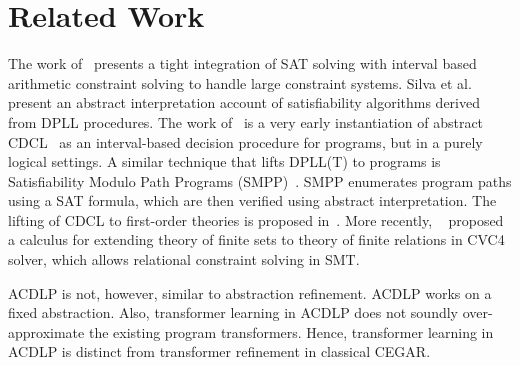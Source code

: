 \section{Related Work}
%
The work of~\cite{franzle} presents a tight integration of SAT solving
with interval based arithmetic constraint solving to handle large constraint
systems. 
%
Silva et al.~\cite{sas12} present an abstract interpretation account of 
satisfiability algorithms derived from DPLL procedures.  
%
The work of~\cite{tacas12} is a very early instantiation of abstract 
CDCL~\cite{sas12} as an interval-based decision procedure for programs, 
but in a purely logical settings.  
%
A similar technique that lifts DPLL(T) to programs is Satisfiability Modulo 
Path Programs (SMPP)~\cite{SMPP}. SMPP enumerates program paths using a SAT 
formula, which are then verified using abstract interpretation.  
%
%
The lifting of CDCL to first-order theories is proposed
in~\cite{dpll,ndsmt,vmcai13}.
%
  More recently, ~\cite{cade17} proposed a calculus for extending theory of
  finite sets to theory of finite relations in CVC4 solver, which allows
  relational constraint solving in SMT.  
  
  ACDLP is not, however, similar to abstraction refinement. ACDLP works on a fixed
  abstraction. Also, transformer learning in ACDLP does not soundly over-approximate
  the existing program transformers. Hence, transformer learning in ACDLP is
  distinct from transformer refinement in classical CEGAR. 

%
%
%
%

